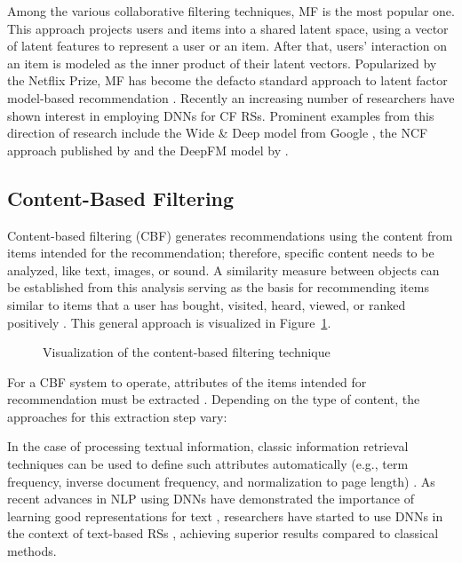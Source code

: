 Among the various collaborative filtering techniques, \ac{MF} \parencite{he2016fast} is the most popular one. This approach projects users and items into a shared latent space, using a  vector of latent features to represent a user or an item. After that, users' interaction on an item is modeled as the inner product of their latent vectors. Popularized by the Netflix Prize, MF has become the defacto standard approach to latent factor model-based recommendation \parencite{he2017neural}. Recently an increasing number of researchers have shown interest in employing \acp{DNN} for \ac{CF} \acp{RS}. Prominent examples from this direction of research include the Wide \& Deep model from Google \parencite{cheng2016wide}, the \ac{NCF} approach published by \cite{he2017neural} and the DeepFM model by \cite{guo2017deepfm}.

\subsection{Content-Based Filtering}
Content-based filtering (\acs{CBF}) generates recommendations using the content from items intended for the recommendation; therefore, specific content needs to be analyzed, like text, images, or sound. A similarity measure between objects can be established from this analysis serving as the basis for recommending items similar to items that a user has bought, visited, heard, viewed, or ranked positively \parencite{bobadilla2013recommender}. This general approach is visualized in Figure~\ref{fig:cbf}. 
\begin{figure}[H]
	\centering
	
	\caption{Visualization of the content-based filtering technique}
	\label{fig:cbf}
\end{figure}
For a \ac{CBF} system to operate, attributes of the items intended for recommendation must be extracted \parencite{bobadilla2013recommender}. Depending on the type of content, the approaches for this extraction step vary:

In the case of processing textual information, classic information retrieval techniques can be used to define such attributes automatically (e.g., term frequency, inverse document frequency, and normalization to page length) \parencite{pazzani2007content}. As recent advances in \ac{NLP} using \acp{DNN} have demonstrated the importance of learning good representations for text \parencite{le2014distributed}, researchers have started to use \acp{DNN} in the context of text-based \acp{RS} \parencite{chen2017joint}, achieving superior results compared to classical methods. 
\pagebreak

